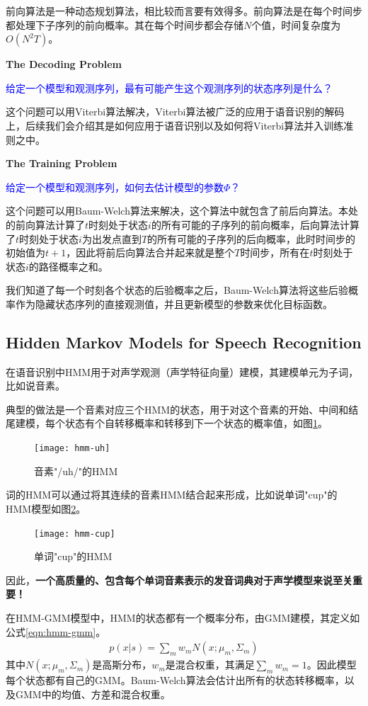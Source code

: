 前向算法是一种动态规划算法，相比较而言要有效得多。前向算法是在每个时间步都处理下子序列的前向概率。其在每个时间步都会存储$N$个值，时间复杂度为$O(N^{2}T)$。

{\bf The Decoding Problem}

\textcolor{blue}{给定一个模型和观测序列，最有可能产生这个观测序列的状态序列是什么？}

这个问题可以用Viterbi算法解决，Viterbi算法被广泛的应用于语音识别的解码上，后续我们会介绍其是如何应用于语音识别以及如何将Viterbi算法并入训练准则之中。

{\bf The Training Problem}

\textcolor{blue}{给定一个模型和观测序列，如何去估计模型的参数$\Phi$？}

这个问题可以用Baum-Welch算法来解决，这个算法中就包含了前后向算法。本处的前向算法计算了$t$时刻处于状态$i$的所有可能的子序列的前向概率，后向算法计算了$t$时刻处于状态$i$为出发点直到$T$的所有可能的子序列的后向概率，此时时间步的初始值为$t+1$，因此将前后向算法合并起来就是整个$T$时间步，所有在$t$时刻处于状态$i$的路径概率之和。

我们知道了每一个时刻各个状态的后验概率之后，Baum-Welch算法将这些后验概率作为隐藏状态序列的直接观测值，并且更新模型的参数来优化目标函数。

\subsection{Hidden Markov Models for Speech Recognition} 
在语音识别中HMM用于对声学观测（声学特征向量）建模，其建模单元为子词，比如说音素。

典型的做法是一个音素对应三个HMM的状态，用于对这个音素的开始、中间和结尾建模，每个状态有个自转移概率和转移到下一个状态的概率值，如图\ref{fig:hmm-uh}。
\begin{figure}[htbp]
	\centering
	\texttt{[image: hmm-uh]}
	\caption{音素"/uh/"的HMM\label{fig:hmm-uh}}
\end{figure}

词的HMM可以通过将其连续的音素HMM结合起来形成，比如说单词"cup"的HMM模型如图\ref{fig:hmm-cup}。
\begin{figure}[htbp]
	\centering
	\texttt{[image: hmm-cup]}
	\caption{单词"cup"的HMM\label{fig:hmm-cup}}
\end{figure}

因此，{\bf 一个高质量的、包含每个单词音素表示的发音词典对于声学模型来说至关重要！}

在HMM-GMM模型中，HMM的状态都有一个概率分布，由GMM建模，其定义如公式\ref{eqn:hmm-gmm}。
\begin{align}
\label{eqn:hmm-gmm}
p(x|s) = \sum_{m} w_m N(x;\mu_{m}, \Sigma_{m})
\end{align}
其中$N(x;\mu_{m}, \Sigma_{m})$是高斯分布，$w_m$是混合权重，其满足$\sum_{m}w_{m}=1$。因此模型每个状态都有自己的GMM。Baum-Welch算法会估计出所有的状态转移概率，以及GMM中的均值、方差和混合权重。

